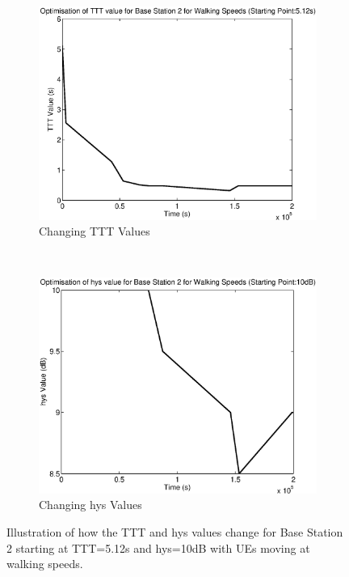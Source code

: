 \begin{figure}[H]
        \centering
        \begin{subfigure}[b]{0.49\textwidth}
                \includegraphics[width=\textwidth]{figures/graphs/walkhigh/TTT2.eps}
                \caption{Changing TTT Values}
        \end{subfigure}%
        ~ %
        \begin{subfigure}[b]{0.49\textwidth}
                \includegraphics[width=\textwidth]{figures/graphs/walkhigh/hys2.eps}
                \caption{Changing hys Values}
        \end{subfigure}
        \caption{Illustration of how the TTT and hys values change for Base Station 2 starting at TTT=5.12s and hys=10dB with UEs moving at walking speeds.}
\end{figure}
